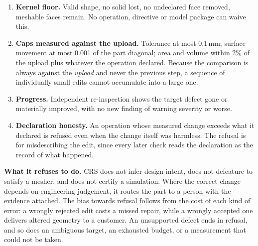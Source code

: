 \documentclass[10pt,onecolumn]{article}
\newcommand{\topic}[1]{\textbf{#1.}\hspace{0.5em}\ignorespaces}
\begin{document}
\begin{enumerate}
  \item \topic{Kernel floor} Valid shape, no solid lost, no undeclared face removed, meshable faces
        remain. No operation, directive or model package can waive this.
  \item \topic{Caps measured against the upload} Tolerance at most 0.1\,mm; surface movement at most
        0.001 of the part diagonal; area and volume within 2\% of the upload plus whatever the
        operation declared. Because the comparison is always against the \emph{upload} and never the
        previous step, a sequence of individually small edits cannot accumulate into a large one.
  \item \topic{Progress} Independent re-inspection shows the target defect gone or materially
        improved, with no new finding of warning severity or worse.
  \item \topic{Declaration honesty} An operation whose measured change exceeds what it declared is
        refused even when the change itself was harmless. The refusal is for misdescribing the
        edit, since every later check reads the declaration as the record of what happened.
\end{enumerate}

\topic{What it refuses to do} CRS does not infer design intent, does not defeature to satisfy a
mesher, and does not certify a simulation. Where the correct change depends on engineering
judgement, it routes the part to a person with the evidence attached. The bias towards refusal
follows from the cost of each kind of error: a wrongly rejected edit costs a missed repair, while a
wrongly accepted one delivers altered geometry to a customer. An unsupported defect ends in refusal, and so does
an ambiguous target, an exhausted budget, or a measurement that could not be taken.
\end{document}
